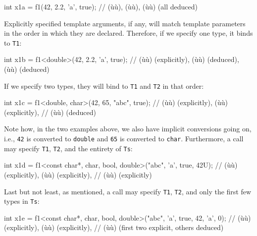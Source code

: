 \begin{emcppslisting}[emcppsbatch=e17]
int x1a = f1(42, 2.2, 'a', true);
    // (ù{}ù), (ù{}ù), (ù{}ù) (all deduced)
\end{emcppslisting}
    

\noindent Explicitly specified template arguments, if any, will match template
parameters in the order in which they are declared. Therefore, if we
specify one type, it binds to \lstinline!T1!:

\begin{emcppslisting}[emcppsbatch=e17]
int x1b = f1<double>(42, 2.2, 'a', true);
    // (ù{}ù) (explicitly), (ù{}ù) (deduced), (ù{}ù) (deduced)
\end{emcppslisting}
    

\noindent If we specify two types, they will bind to \lstinline!T1! and \lstinline!T2!
in that order:

\begin{emcppslisting}[emcppsbatch=e17]
int x1c = f1<double, char>(42, 65, "abc", true);
    // (ù{}ù) (explicitly), (ù{}ù) (explicitly),
    // (ù{}ù) (deduced)
\end{emcppslisting}
    

\noindent Note how, in the two examples above, we also have implicit conversions
going on, i.e., \lstinline!42! is converted to \lstinline!double! and
\lstinline!65! is converted to \lstinline!char!. Furthermore, a call may
specify \lstinline!T1!, \lstinline!T2!, and the entirety of \lstinline!Ts!:

\begin{emcppslisting}[emcppsbatch=e17]
int x1d = f1<const char*, char, bool, double>("abc", 'a', true, 42U);
    // (ù{}ù) (explicitly), (ù{}ù) (explicitly),
    // (ù{}ù) (explicitly)
\end{emcppslisting}
    

\noindent Last but not least, as mentioned, a call may specify \lstinline!T1!,
\lstinline!T2!, and only the first few types in \lstinline!Ts!:

\begin{emcppslisting}[emcppsbatch=e17]
int x1e = f1<const char*, char, bool, double>("abc", 'a', true, 42, 'a', 0);
    // (ù{}ù) (explicitly), (ù{}ù) (explicitly),
    // (ù{}ù) (first two explicit, others deduced)
\end{emcppslisting}
    

